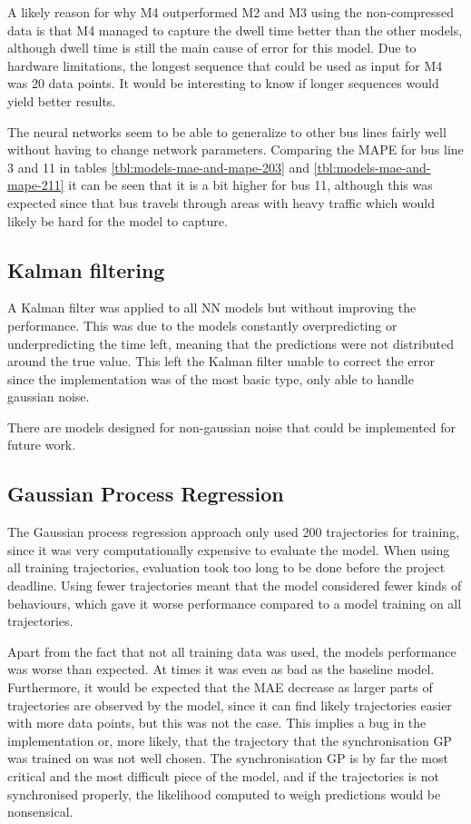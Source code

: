 A likely reason for why M4 outperformed M2 and M3 using the non-compressed data is that M4 managed to capture the dwell time better than the other models, although dwell time is still the main cause of error for this model. Due to hardware limitations, the longest sequence that could be used as input for M4 was 20 data points. It would be interesting to know if longer sequences would yield better results.

The neural networks seem to be able to generalize to other bus lines fairly well without having to change network parameters. Comparing the MAPE for bus line 3 and 11 in tables \ref{tbl:models-mae-and-mape-203} and \ref{tbl:models-mae-and-mape-211} it can be seen that it is a bit higher for bus 11, although this was expected since that bus travels through areas with heavy traffic which would likely be hard for the model to capture.

\subsection{Kalman filtering}
A Kalman filter was applied to all NN models but without improving the performance. This was due to the models constantly overpredicting or underpredicting the time left, meaning that the predictions were not distributed around the true value. This left the Kalman filter unable to correct the error since the implementation was of the most basic type, only able to handle gaussian noise. 

There are models designed for non-gaussian noise that could be implemented for future work.

\subsection{Gaussian Process Regression}
The Gaussian process regression approach only used 200 trajectories
for training, since it was very computationally expensive to evaluate
the model. When using all training trajectories, evaluation took too
long to be done before the project deadline. Using fewer trajectories
meant that the model considered fewer kinds of behaviours, which gave
it worse performance compared to a model training on all trajectories.

Apart from the fact that not all training data was used, the models performance was worse than expected. At times it was even as bad as the baseline model. Furthermore, it would be expected that the MAE decrease as larger parts of trajectories are observed by the model, since it can find likely trajectories easier with more data points, but this was not the case. This implies a bug in the implementation or, more likely, that the trajectory that the synchronisation GP was trained on was not well chosen. The synchronisation GP is by far the most critical and the most difficult piece of the model, and if the trajectories is not synchronised properly, the likelihood computed to weigh predictions would be nonsensical. 

